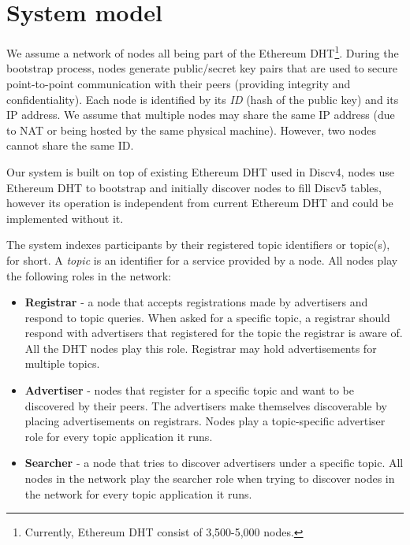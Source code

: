 
\section{System model}
\label{sec:model}

We assume a network of nodes all being part of the Ethereum DHT\footnote{Currently, Ethereum DHT consist of 3,500-5,000 nodes.}. During the bootstrap process, nodes generate public/secret key pairs that are used to secure point-to-point communication with their peers (providing integrity and confidentiality). Each node is identified by its \emph{ID} (hash of the public key) and its IP address. We assume that multiple nodes may share the same IP address (due to NAT or being hosted by the same physical machine). However,  two nodes cannot share the same ID.  

Our system is built on top of existing Ethereum DHT used in Discv4, \ie nodes use Ethereum DHT to bootstrap and initially discover nodes to fill Discv5 tables,  however its operation is independent from current Ethereum DHT and could be implemented without it.

The system indexes participants by their registered topic identifiers or topic(s), for short. 
A \emph{topic} is an identifier for a service provided by a node. 
All nodes play the following roles in the network:

\begin{itemize}
    \item \textbf{Registrar} - a node that accepts registrations made by advertisers and respond to topic queries. When asked for a specific topic, a registrar should respond with advertisers that registered for the topic the registrar is aware of. 
All the DHT nodes play this role. 
Registrar may hold advertisements for multiple topics. 
    \item \textbf{Advertiser} - nodes that register for a specific topic and want to be discovered by their peers. The advertisers make themselves discoverable by placing advertisements on registrars. Nodes play a topic-specific advertiser role for every topic application it runs.
    \item \textbf{Searcher} - a node that tries to discover advertisers under a specific topic. 
All nodes in the network play the searcher role when trying to discover nodes in the network for every topic application it runs.
\end{itemize}

